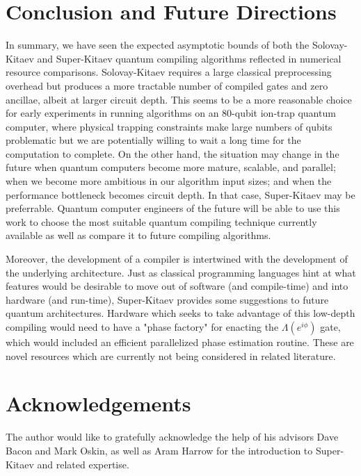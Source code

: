\section{Conclusion and Future Directions}

In summary, we have seen the expected asymptotic bounds of both the
Solovay-Kitaev and Super-Kitaev quantum compiling algorithms reflected in
numerical resource comparisons. Solovay-Kitaev requires a large classical
preprocessing overhead but produces a more tractable number of compiled
gates and zero ancillae, albeit at larger circuit depth. This seems to be
a more reasonable choice for early experiments in running algorithms on an
80-qubit ion-trap quantum computer, where physical trapping constraints
make large numbers of qubits problematic but we are potentially willing to
wait a long time for the computation to complete. On the other hand, the
situation may change in the future when
quantum computers become more mature, scalable, and parallel;
when we become more ambitious in our
algorithm input sizes; and when the performance bottleneck becomes circuit depth.
In that case, Super-Kitaev may be preferrable.
Quantum computer engineers of the future will be able to use this work to
choose the most suitable quantum compiling technique currently available
as well as compare it to future compiling algorithms.

Moreover, the development of a compiler is intertwined with the
development of the underlying architecture. Just as classical programming
languages hint at what features would be desirable to move out of software
(and compile-time)
and into hardware (and run-time), Super-Kitaev provides some suggestions
to future quantum architectures. Hardware which seeks to take advantage of
this low-depth compiling would need to have a
"phase factory" for enacting the $\Lambda(e^{i\phi})$ gate, which would
included an efficient parallelized phase estimation routine. These are
novel resources which are currently not being considered in related literature.

\section{Acknowledgements}

The author would like to gratefully acknowledge the help of
his advisors Dave Bacon and Mark Oskin,
as well as Aram Harrow for the introduction to
Super-Kitaev and related expertise.